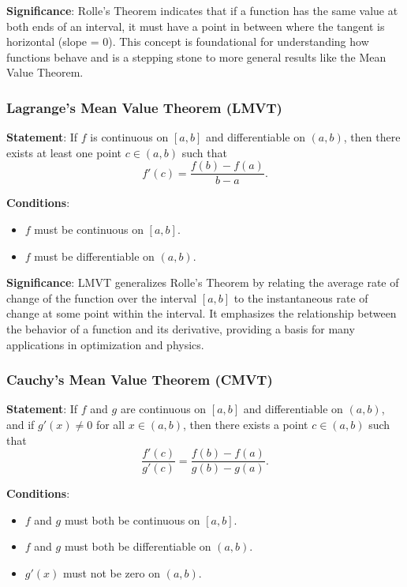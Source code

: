 \documentclass[a4paper,12pt]{book}
\begin{document}
\textbf{Significance}: Rolle's Theorem indicates that if a function has the same value at both ends of an interval, it must have a point in between where the tangent is horizontal (slope = 0). This concept is foundational for understanding how functions behave and is a stepping stone to more general results like the Mean Value Theorem.

\subsubsection{Lagrange's Mean Value Theorem (LMVT)}

\textbf{Statement}: If \( f \) is continuous on \([a, b]\) and differentiable on \((a, b)\), then there exists at least one point \( c \in (a, b) \) such that 
\[
f'(c) = \dfrac{f(b) - f(a)}{b - a}.
\]

\textbf{Conditions}:

\begin{itemize}
	\item 
	\( f \) must be continuous on \([a, b]\).
	\item 
	\( f \) must be differentiable on \((a, b)\).
\end{itemize}

\textbf{Significance}: LMVT generalizes Rolle's Theorem by relating the average rate of change of the function over the interval \([a, b]\) to the instantaneous rate of change at some point within the interval. It emphasizes the relationship between the behavior of a function and its derivative, providing a basis for many applications in optimization and physics.

\subsubsection{Cauchy's Mean Value Theorem (CMVT)}

\textbf{Statement}: If \( f \) and \( g \) are continuous on \([a, b]\) and differentiable on \((a, b)\), and if \( g'(x) \neq 0 \) for all \( x \in (a, b) \), then there exists a point \( c \in (a, b) \) such that
\[
\dfrac{f'(c)}{g'(c)} = \dfrac{f(b) - f(a)}{g(b) - g(a)}.
\]

\textbf{Conditions}:

\begin{itemize}
	\item 
	\( f \) and \( g \) must both be continuous on \([a, b]\).
	\item 
	\( f \) and \( g \) must both be differentiable on \((a, b)\).
	\item 
	\( g'(x) \) must not be zero on \((a, b)\).
\end{itemize}
\end{document}
